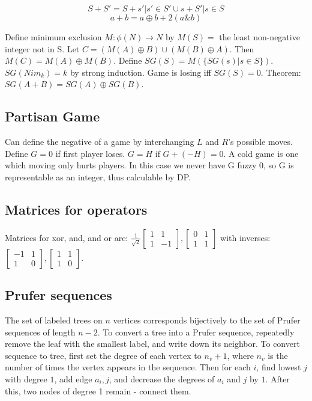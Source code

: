 	\[ S + S' = {S + s' | s' \in S'} \cup {s + S' | s \in S} \]
	\[ a + b = a \oplus b + 2(a\&b) \]

	Define minimum exclusion $M : \phi(N) \rightarrow N$ by $M(S) = $ the least non-negative integer not in S.
	Let $C = (M(A) \oplus B) \cup (M(B) \oplus A)$. Then $M(C) = M(A) \oplus M(B)$.
	Define $SG(S) = M (\{SG(s) | s \in S\})$.
	$SG(Nim_k) = k$ by strong induction. Game is losing iff $SG(S) = 0$. Theorem: $SG(A + B) = SG(A) \oplus SG(B)$.

	\subsection{Partisan Game}
	Can define the negative of a game by interchanging $L$ and $R$'s possible moves.
	Define $G = 0$ if first player loses. $G = H$ if $G + (-H) = 0$.
	A cold game is one which moving only hurts players. In this case we never have G fuzzy 0, so G is
	representable as an integer, thus calculable by DP.

	\subsection{Matrices for operators}
	Matrices for xor, and, and or are: $\frac{1}{\sqrt{2}} \begin{bmatrix} 1 & 1 \\ 1 & -1\end{bmatrix}, \begin{bmatrix} 0 & 1 \\ 1 & 1\end{bmatrix}$
	with inverses: $\begin{bmatrix} -1 & 1 \\ 1 & 0\end{bmatrix}, \begin{bmatrix} 1 & 1 \\ 1 & 0\end{bmatrix}$.

	\subsection{Prufer sequences}
	The set of labeled trees on $n$ vertices corresponds bijectively to the set of Prufer sequences of length $n-2$.
	To convert a tree into a Prufer sequence, repeatedly remove the leaf with the smallest label, and write down its neighbor.
	To convert sequence to tree, first set the degree of each vertex to $n_v + 1$, where $n_v$ is the number of times
	the vertex appears in the sequence. Then for each $i$, find lowest $j$ with degree $1$, add edge $a_i, j$, and decrease
	the degrees of $a_i$ and $j$ by $1$. After this, two nodes of degree 1 remain - connect them.

